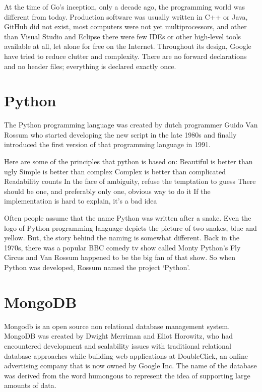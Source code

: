 At the time of Go's inception, only a decade ago, the programming world was different from today. Production software was usually written in C++ or Java, GitHub did not exist, most computers were not yet multiprocessors, and other than Visual Studio and Eclipse there were few IDEs or other high-level tools available at all, let alone for free on the Internet. Throughout its design, Google have tried to reduce clutter and complexity. There are no forward declarations and no header files; everything is declared exactly once.\newline


\section {Python}
The Python programming language was created by dutch programmer Guido Van Rossum who started developing the new script in the late 1980s and finally introduced the first version of that programming language in 1991.\newline

Here are some of the principles that python is based on:\newline
Beautiful is better than ugly\newline
Simple is better than complex\newline
Complex is better than complicated\newline
Readability counts\newline
In the face of ambiguity, refuse the temptation to guess\newline
There should be one, and preferably only one, obvious way to do it\newline
If the implementation is hard to explain, it’s a bad idea\newline

Often people assume that the name Python was written after a snake. Even the logo of Python programming language depicts the picture of two snakes, blue and yellow.  But, the story behind the naming is somewhat different. Back in the 1970s, there was a popular BBC comedy tv show called Monty Python’s Fly Circus and Van Rossum happened to be the big fan of that show. So when Python was developed, Rossum named the project ‘Python’.\newline
\section {MongoDB}
Mongodb is an open source non relational database management system. MongoDB was created by Dwight Merriman and Eliot Horowitz, who had encountered development and scalability issues with traditional relational database approaches while building web applications at DoubleClick, an online advertising company that is now owned by Google Inc. The name of the database was derived from the word humongous to represent the idea of supporting large amounts of data.\newline

